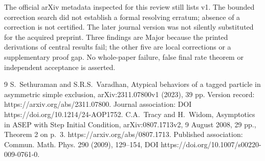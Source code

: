 \documentclass[10pt]{article}
\begin{document}
The official arXiv metadata inspected for this review still lists v1. The bounded correction search did not establish a formal resolving erratum; absence of a correction is not certified. The later journal version was not silently substituted for the acquired preprint. Three findings are Major because the printed derivations of central results fail; the other five are local corrections or a supplementary proof gap. No whole-paper failure, false final rate theorem or independent acceptance is asserted.\par
9 S. Sethuraman and S.R.S. Varadhan, Atypical behaviors of a tagged particle in asymmetric simple exclusion, arXiv:2311.07800v1 (2023), 39 pp. Version record: https://arxiv.org/abs/2311.07800. Journal association: DOI https://doi.org/10.1214/24-AOP1752. C.A. Tracy and H. Widom, Asymptotics in ASEP with Step Initial Condition, arXiv:0807.1713v2, 9 August 2008, 29 pp., Theorem 2 on p. 3. https://arxiv.org/abs/0807.1713. Published association: Commun. Math. Phys. 290 (2009), 129–154, DOI https://doi.org/10.1007/s00220-009-0761-0.\par
\end{document}

